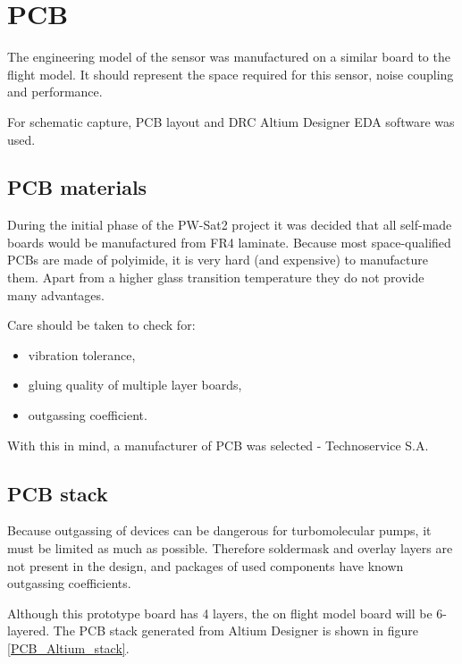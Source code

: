 \section{PCB}
    The engineering model of the sensor was manufactured on a similar board to the flight model. It should represent the space required for this sensor, noise coupling and performance.

    For schematic capture, PCB layout and DRC Altium Designer EDA software was used.

    \subsection{PCB materials}
        During the initial phase of the PW-Sat2 project it was decided that all self-made boards would be manufactured from FR4 laminate. Because most space-qualified PCBs are made of polyimide, it is very hard (and expensive) to manufacture them. Apart from a higher glass transition temperature they do not provide many advantages.

        Care should be taken to check for:
        \begin{itemize}
            \item vibration tolerance,
            \item gluing quality of multiple layer boards,
            \item outgassing coefficient.
        \end{itemize}

        With this in mind, a manufacturer of PCB was selected - Technoservice S.A.

    \subsection{PCB stack}
        Because outgassing of devices can be dangerous for turbomolecular pumps, it must be limited as much as possible. Therefore soldermask and overlay layers are not present in the design, and packages of used components have known outgassing coefficients.

        Although this prototype board has 4 layers, the on flight model board will be 6-layered. The PCB stack generated from Altium Designer is shown in figure \ref{PCB_Altium_stack}.

